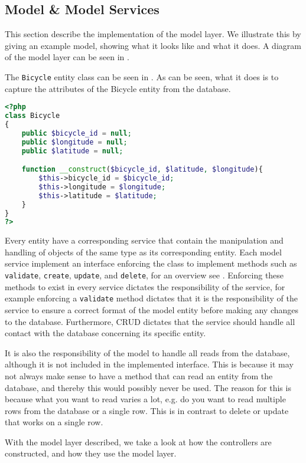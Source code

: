 \subsection{Model \& Model Services}
This section describe the implementation of the model layer. 
We illustrate this by giving an example model, showing what it looks like and what it does.
A diagram of the model layer can be seen in .

The \texttt{Bicycle} entity class can be seen in .
As can be seen, what it does is to capture the attributes of the Bicycle entity from the database.

\begin{minipage}{\textwidth}
\begin{lstlisting}[language=php, label=lst:bicycleModel, caption={Bicycle Class.}]
<?php
class Bicycle
{
    public $bicycle_id = null;
    public $longitude = null;
    public $latitude = null;

    function __construct($bicycle_id, $latitude, $longitude){
        $this->bicycle_id = $bicycle_id;
        $this->longitude = $longitude;
        $this->latitude = $latitude;
    }
}
?>
\end{lstlisting}
\end{minipage}

Every entity have a corresponding service that contain the manipulation and handling of objects of the same type as its corresponding entity. 
Each model service implement an interface enforcing the class to implement methods such as \texttt{validate}, \texttt{create}, \texttt{update}, and \texttt{delete}, for an overview see . 
Enforcing these methods to exist in every service dictates the responsibility of the service, for example enforcing a \texttt{validate} method dictates that it is the responsibility of the service to ensure a correct format of the model entity before making any changes to the database. 
Furthermore, CRUD dictates that the service should handle all contact with the database concerning its specific entity.

It is also the responsibility of the model to handle all reads from the database, although it is not included in the implemented interface.
This is because it may not always make sense to have a method that can read an entity from the database, and thereby this would possibly never be used.
The reason for this is because what you want to read varies a lot, e.g. do you want to read multiple rows from the database or a single row.
This is in contrast to delete or update that works on a single row.

With the model layer described, we take a look at how the controllers are constructed, and how they use the model layer.